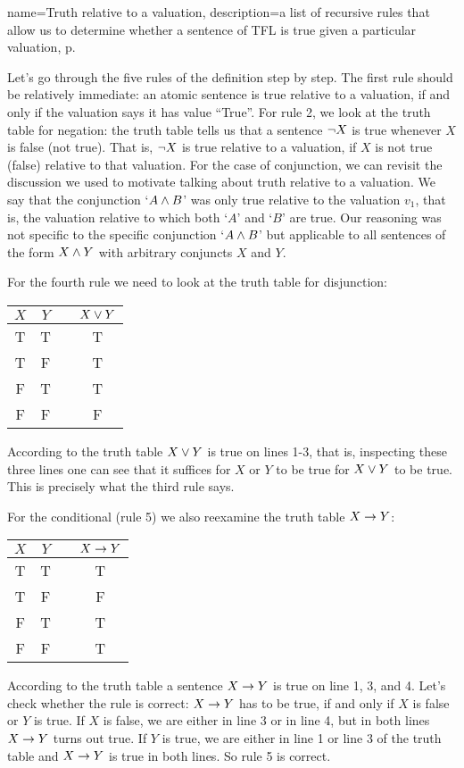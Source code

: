 {
name=Truth relative to a valuation,
description={a list of recursive rules that allow us to determine whether a sentence of TFL is true given a particular valuation, p.~\pageref{Truthval}}
}

Let's go through the five rules of the definition step by step. The first rule should be relatively immediate: an atomic sentence is true relative to a valuation, if and only if the valuation says it has value ``True''. For rule 2, we look at the truth table for negation: the truth table tells us that a sentence $\neg X$ is true whenever $X$ is false (not true). That is, $\neg X$ is true relative to a valuation, if $X$ is not true (false) relative to that valuation. For the case of conjunction, we can revisit the discussion we used to motivate talking about truth relative to a valuation. We say that the conjunction `$A\mathbin{\wedge} B$' was only true relative to the valuation $v_1$, that is, the valuation relative to which both `$A$' and `$B$' are true. Our reasoning was not specific to the specific conjunction `$A\mathbin{\wedge} B$' but applicable to all sentences of the form $X\mathbin{\wedge} Y$ with arbitrary conjuncts $X$ and $Y$.

For the fourth rule we need to look at the truth table for disjunction:
\begin{center}
\begin{tabular}{ccc|c}
$X$&$Y$&&$X\vee Y$\\\hline
T & T && T\\
T & F && T\\
F & T && T\\
F & F && F
\end{tabular}
\end{center}
According to the truth table $X\vee Y$ is true on lines 1-3, that is, inspecting these three lines one can see that it suffices for $X$ or $Y$ to be true for $X\vee Y$ to be true. This is precisely what the third rule says.

For the conditional (rule 5) we also reexamine the truth table $X\rightarrow Y$:
\begin{center}
\begin{tabular}{ccc|c}
$X$&$Y$&&$X\rightarrow Y$\\\hline
T & T && T\\
T & F && F\\
F & T && T\\
F & F && T
\end{tabular}
\end{center}
According to the truth table a sentence $X\rightarrow Y$ is true on line 1, 3, and 4. Let's check whether the rule is correct: $X\rightarrow Y$ has to be true, if and only if $X$ is false or $Y$ is true. If $X$ is false, we are either in line 3 or in line 4, but in both lines $X\rightarrow Y$ turns out true. If $Y$ is true, we are either in line 1 or line 3 of the truth table and $X\rightarrow Y$ is true in both lines. So rule 5 is correct.

